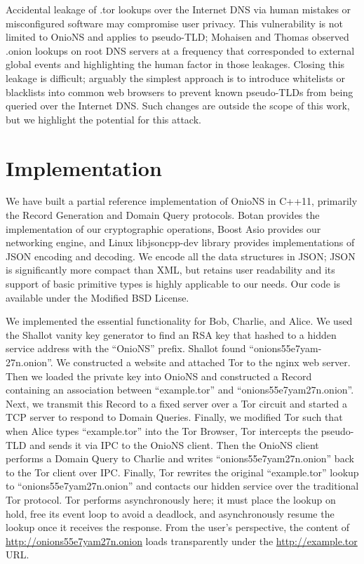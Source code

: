 \documentclass{sig-alternate}
\begin{document}
Accidental leakage of .tor lookups over the Internet DNS via human mistakes or misconfigured software may compromise user privacy. This vulnerability is not limited to OnioNS and applies to pseudo-TLD; Mohaisen and Thomas observed .onion lookups on root DNS servers at a frequency that corresponded to external global events and highlighting the human factor in those leakages.\cite{thomasmeasuring} Closing this leakage is difficult; arguably the simplest approach is to introduce whitelists or blacklists into common web browsers to prevent known pseudo-TLDs from being queried over the Internet DNS. Such changes are outside the scope of this work, but we highlight the potential for this attack.

\newpage

\section{Implementation}

We have built a partial reference implementation of OnioNS in C++11, primarily the Record Generation and Domain Query protocols. Botan provides the implementation of our cryptographic operations, Boost Asio provides our networking engine, and Linux libjsoncpp-dev library provides implementations of JSON encoding and decoding. We encode all the data structures in JSON; JSON is significantly more compact than XML, but retains user readability and its support of basic primitive types is highly applicable to our needs. Our code is available under the Modified BSD License. %


We implemented the essential functionality for Bob, Charlie, and Alice. We used the Shallot\cite{KatmagicShallot} vanity key generator to find an RSA key that hashed to a hidden service address with the ``OnioNS'' prefix. Shallot found ``onions55e7yam-27n.onion''. We constructed a website and attached Tor to the nginx web server. Then we loaded the private key into OnioNS and constructed a Record containing an association between ``example.tor'' and ``onions55e7yam27n.onion''. Next, we transmit this Record to a fixed server over a Tor circuit and started a TCP server to respond to Domain Queries. Finally, we modified Tor such that when Alice types ``example.tor'' into the Tor Browser, Tor intercepts the pseudo-TLD and sends it via IPC to the OnioNS client. Then the OnioNS client performs a Domain Query to Charlie and writes ``onions55e7yam27n.onion'' back to the Tor client over IPC. Finally, Tor rewrites the original ``example.tor'' lookup to ``onions55e7yam27n.onion'' and contacts our hidden service over the traditional Tor protocol. Tor performs asynchronously here; it must place the lookup on hold, free its event loop to avoid a deadlock, and asynchronously resume the lookup once it receives the response. From the user's perspective, the content of \url{http://onions55e7yam27n.onion} loads transparently under the \url{http://example.tor} URL.
\end{document}
